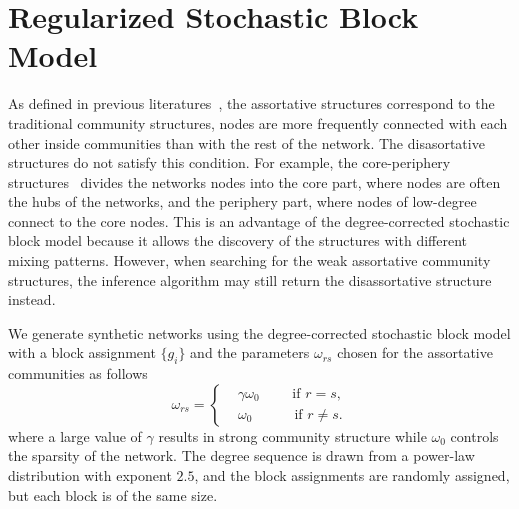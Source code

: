 \section{Regularized Stochastic Block Model} \label{sec:2.5}
As defined in previous literatures~\cite{newman2004finding,fortunato2010community}, the assortative structures correspond to the traditional community structures, nodes are more frequently connected with each other inside communities than with the rest of the network. The disasortative structures do not satisfy this condition. For example, the core-periphery structures~\cite{borgatti2000models} divides the networks nodes into the core part, where nodes are often the hubs of the networks, and the periphery part, where nodes of low-degree connect to the core nodes. This is an advantage of the degree-corrected stochastic block model because it allows the discovery of the structures with different mixing patterns. However, when searching for the weak assortative community structures, the inference algorithm may still return the disassortative structure\cite{decelle2011asymptotic} instead.

We generate synthetic networks using the degree-corrected stochastic block model with a block assignment $\{g_i\}$ and the parameters $\omega_{rs}$ chosen for the assortative communities as follows
\begin{equation} \label{eq:synthetic}
\omega_{rs}=
    \begin{cases}
    &\gamma \omega_{0} \quad \quad  \text{ if  } r=s,\\
    &\omega_{0} \quad \quad \quad  \text{if  } r\neq s.
    \end{cases}
\end{equation}
where a large value of $\gamma$ results in strong community structure while $\omega_{0}$ controls the sparsity of the network. The degree sequence is drawn from a power-law distribution with exponent $2.5$, and the block assignments are randomly assigned, but each block is of the same size.

